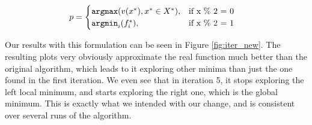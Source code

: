 \begin{align}
  p &=
  \begin{cases}
    \texttt{argmax} ( v(x^*), x^* \in X^*), & \text{if } $x \% 2 = 0$\\
    \texttt{argmin}_i (f_i^*), & \text{if } $x \% 2 = 1$
  \end{cases}
\end{align}

Our results with this formulation can be seen in Figure \ref{fig:iter_new}. The resulting plots very obviously approximate the real function much better than the original algorithm, which leads to it exploring other minima than just the one found in the first iteration. We even see that in iteration 5, it stops exploring the left local minimum, and starts exploring the right one, which is the global minimum. This is exactly what we intended with our change, and is consistent over several runs of the algorithm.

